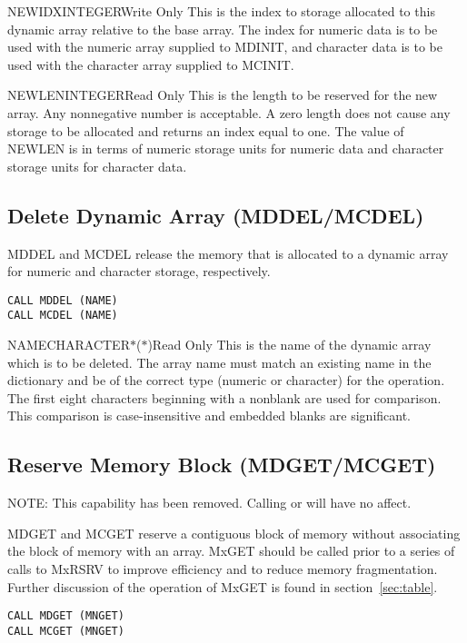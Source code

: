 \begin{argy}{NEWIDX}{INTEGER}{Write Only}
This is the index to storage allocated to this dynamic array relative to
the base array. The index for numeric data is to be used with the numeric
array supplied to MDINIT, and character data is to be used with the
character array supplied to MCINIT.
\end{argy}

\begin{argy}{NEWLEN}{INTEGER}{Read Only}
This is the length to be reserved for the new array. Any nonnegative number
is acceptable.  A zero length does not cause any storage to be allocated and
returns an index equal to one. The value of NEWLEN is in terms of numeric
storage units for numeric data and character storage units for character
data.
\end{argy}

\subsection{Delete Dynamic Array (MDDEL/MCDEL)}
MDDEL and MCDEL release the memory that is allocated to a dynamic array for
numeric and character storage, respectively.
\begin{verbatim}
CALL MDDEL (NAME)
CALL MCDEL (NAME)
\end{verbatim}

\begin{argy}{NAME}{CHARACTER$*$($*$)}{Read Only}
This is the name of the dynamic array which is to be deleted.  The array
name must match an existing name in the dictionary and be of the correct
type (numeric or character) for the operation. The first eight characters
beginning with a nonblank are used for comparison.
This comparison is case-insensitive and embedded blanks are
significant.
\end{argy}

\subsection{Reserve Memory Block (MDGET/MCGET)}
NOTE: This capability has been removed.  Calling  or  will have no affect.

MDGET and MCGET reserve a contiguous block of memory without associating the
block of memory with an array.  MxGET should be called prior to a
series of calls to MxRSRV to improve efficiency and to reduce memory
fragmentation.  Further discussion of the operation of MxGET is
found in section~\ref{sec:table}.
\begin{verbatim}
CALL MDGET (MNGET)
CALL MCGET (MNGET)
\end{verbatim}

